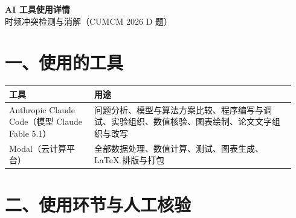 \documentclass[UTF8,zihao=-4,fontset=none,a4paper]{ctexart}
\begin{document}
\begin{center}{\LARGE\bfseries AI 工具使用详情}\\[6pt]{\large 时频冲突检测与消解（CUMCM 2026 D 题）}\end{center}

\section*{一、使用的工具}
\begin{longtable}{@{}p{0.28\linewidth}p{0.66\linewidth}@{}}
\toprule 工具 & 用途 \\ \midrule \endhead \bottomrule \endfoot
Anthropic Claude Code（模型 Claude Fable 5.1） & 问题分析、模型与算法方案比较、程序编写与调试、实验组织、数值核验、图表绘制、论文文字组织与改写 \\
Modal（云计算平台） & 全部数据处理、数值计算、测试、图表生成、LaTeX 排版与打包 \\
\end{longtable}

\section*{二、使用环节与人工核验}

\end{document}
